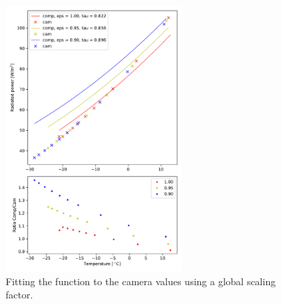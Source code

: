 \begin{figure}[h!]
	\centering
	\includegraphics[width=0.6\textwidth]{img/T_to_P_Fit.pdf}
	\caption{Fitting the function to the camera values using a global scaling factor.}
	\label{fig:TempPowerFit}
\end{figure}